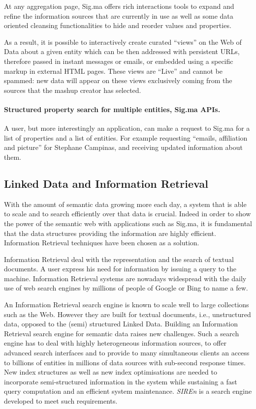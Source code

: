 At any aggregation page, Sig.ma offers rich interactions tools to expand and
refine the information sources that are currently in use as well as some data
oriented cleansing functionalities to hide and reorder values and properties.

As a result, it is possible to interactively create curated ``views'' on the Web
of Data about a given entity which can be then addressed with persistent URLs,
therefore passed in instant messages or emails, or embedded using a specific
markup in external HTML pages. These views are ``Live'' and cannot be spammed:
new data will appear on these views exclusively coming from the sources that
the mashup creator has selected.

\paragraph{Structured property search for multiple entities, Sig.ma APIs.}
A user, but more interestingly an application, can make a request to Sig.ma for
a list of properties and a list of entities. For example requesting ``emails,
affiliation and picture'' for Stephane Campinas, and receiving updated
information about them.

\subsection{Linked Data and Information Retrieval}

With the amount of semantic data growing more each day, a system that is able
to scale and to search efficiently over that data is crucial. Indeed in order
to show the power of the semantic web with applications such as Sig.ma, it is
fundamental that the data structures providing the information are highly
efficient. Information Retrieval techniques have been chosen as a solution.

Information Retrieval deal with the representation and the search of textual
documents. A user express his need for information by issuing a query to the
machine. Information Retrieval systems are nowadays widespread with the daily
use of web search engines by millions of people of Google or Bing to name a
few.

An Information Retrieval search engine is known to scale well
\cite{baeza-yates:2007:icde} to large collections such as the Web. However they
are built for textual documents, i.e., unstructured data, opposed to the
(semi) structured Linked Data. Building an Information Retrieval search engine
for semantic data raises new challenges. Such a search engine has to deal with
highly heterogeneous information sources, to offer advanced search interfaces
and to provide to many simultaneous clients an access to billions of entities
in millions of data sources with sub-second response times. New index
structures as well as new index optimisations are needed to incorporate
semi-structured information in the system while sustaining a fast query
computation and an efficient system maintenance. \emph{SIREn} is a search
engine developed to meet such requirements.	

